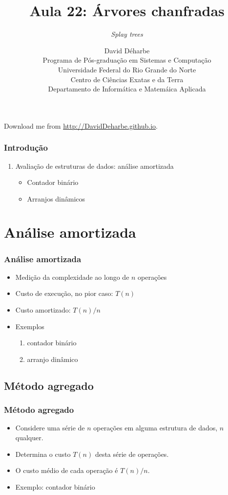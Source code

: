 \documentclass{beamer}
\title{Aula 22: Árvores chanfradas}
\subtitle{\textit{Splay trees\/}}
\author{David Déharbe \\
  Programa de Pós-graduação em Sistemas e Computação \\
  Universidade Federal do Rio Grande do Norte \\
  Centro de Ciências Exatas e da Terra \\
  Departamento de Informática e Matemáica Aplicada}
\date{}
\begin{document}

\begin{frame}
  \titlepage
  Download me from \url{http://DavidDeharbe.github.io}.
\end{frame}

\begin{frame}
  \frametitle{Introdução}
  \tableofcontents

  \begin{enumerate}
    \item Avaliação de estruturas de dados: análise amortizada
      \begin{itemize}
        \item Contador binário
        \item Arranjos dinâmicos
      \end{itemize}
  \end{enumerate}

\end{frame}

\section{Análise amortizada}

\begin{frame}
\frametitle{Análise amortizada}

\begin{itemize}
\item Medição da complexidade ao longo de $n$ operações
\item Custo de execução, no pior caso: $T(n)$
\item Custo amortizado: $T(n)/n$
\item Exemplos
\begin{enumerate}
  \item contador binário
  \item arranjo dinâmico
\end{enumerate}
\end{itemize}
\end{frame}

\subsection{Método agregado}

\begin{frame}

\frametitle{Método agregado}

\begin{itemize}
\item Considere uma série de $n$ operações em alguma estrutura de dados, $n$
  qualquer.

\item Determina o custo $T(n)$ desta série de operações.

\item O custo médio de cada operação é $T(n)/n$.

\item Exemplo: contador binário
\end{itemize}

\end{frame}
\end{document}
